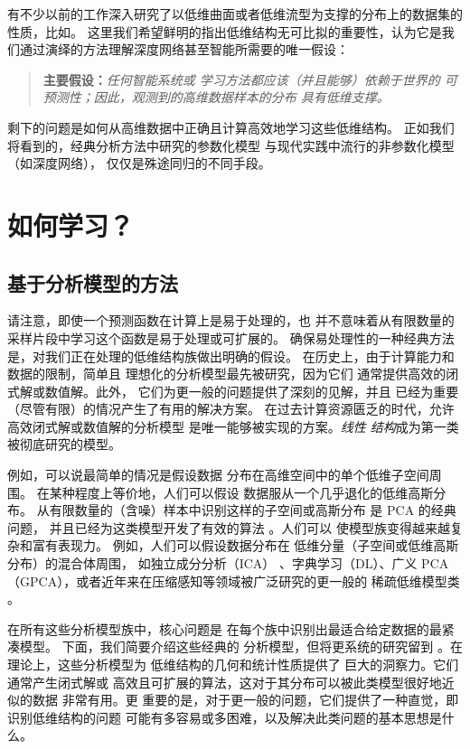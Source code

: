 \documentclass[../../book-main_zh.tex]{subfiles}
\begin{document}
有不少以前的工作深入研究了以低维曲面或者低维流型为支撑的分布上的数据集的性质，比如\cite{ALLARD2012435,LITTLE2017504}。
这里我们希望鲜明的指出低维结构无可比拟的重要性，认为它是我们通过演绎的方法理解深度网络甚至智能所需要的唯一假设：
\begin{quote}
    \textbf{主要假设：}\textit{任何智能系统或
        学习方法都应该（并且能够）依赖于世界的
        可预测性；因此，观测到的高维数据样本的分布
    具有低维支撑。}
\end{quote}
剩下的问题是如何从高维数据中正确且计算高效地学习这些低维结构。
正如我们将看到的，经典分析方法中研究的参数化模型
与现代实践中流行的非参数化模型（如深度网络），
仅仅是殊途同归的不同手段。

\section{如何学习？}

\subsection{基于分析模型的方法}
\label{sec:analytical}
请注意，即使一个预测函数在计算上是易于处理的，也
并不意味着从有限数量的采样片段中学习这个函数是易于处理或可扩展的。
确保易处理性的一种经典方法是，对我们正在处理的低维结构族做出明确的假设。
在历史上，由于计算能力和数据的限制，简单且
理想化的分析模型最先被研究，因为它们
通常提供高效的闭式解或数值解。此外，
它们为更一般的问题提供了深刻的见解，并且
已经为重要（尽管有限）的情况产生了有用的解决方案。
在过去计算资源匮乏的时代，允许高效闭式解或数值解的分析模型
是唯一能够被实现的方案。\textit{线性
结构}成为第一类被彻底研究的模型。

例如，可以说最简单的情况是假设数据
分布在高维空间中的单个低维子空间周围。
在某种程度上等价地，人们可以假设
数据服从一个几乎退化的低维高斯分布。
从有限数量的（含噪）样本中识别这样的子空间或高斯分布
是 PCA 的经典问题，
并且已经为这类模型开发了有效的算法 \cite{JolliffeI2002}。人们可以
使模型族变得越来越复杂和富有表现力。
例如，人们可以假设数据分布在
低维分量（子空间或低维高斯分布）的混合体周围，
如独立成分分析（ICA）
\cite{Ans-1985}、字典学习（DL）、广义 PCA（GPCA）\cite{Vidal-GPCA}，或者近年来在压缩感知等领域被广泛研究的更一般的
稀疏低维模型类
\cite{Wright-Ma-2022}。

在所有这些分析模型族中，核心问题是
在每个族中识别出最适合给定数据的最紧凑模型。
下面，我们简要介绍这些经典的
分析模型，但将更系统的研究留到
。在理论上，这些分析模型为
低维结构的几何和统计性质提供了
巨大的洞察力。它们通常产生闭式解或
高效且可扩展的算法，这对于其分布可以被此类模型很好地近似的数据
非常有用。更
重要的是，对于更一般的问题，它们提供了一种直觉，即识别低维结构的问题
可能有多容易或多困难，以及解决此类问题的基本思想是什么。
\end{document}
